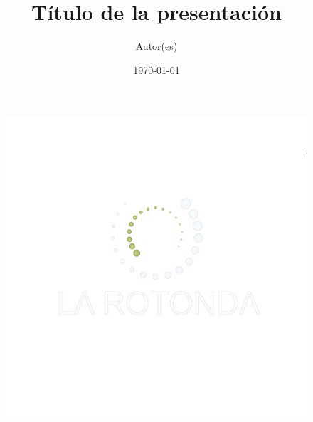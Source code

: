 \documentclass[10pt, aspectratio=169, compress]{beamer}
\title{Título de la presentación}
\author{Autor(es)}
\institute{\large La Rotonda Blog}
\date{\today}
\begin{document}
	\begin{frame}[plain]
		\maketitle
	\end{frame}


	
	
	

\miniframesoff
\begin{frame}
		\begin{figure}
		\centering
		\includegraphics[width = 0.5\linewidth]{fig/larotonda.png}
	\end{figure}
\end{frame}

\end{document}
